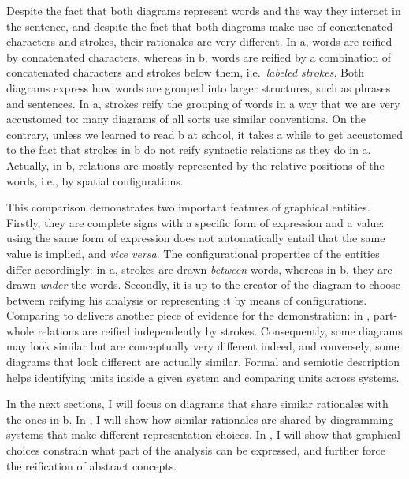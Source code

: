 \documentclass[output=paper]{langsci/langscibook}
\begin{document}
Despite the fact that both diagrams represent words and the way they interact in the sentence, and despite the fact that both diagrams make use of concatenated characters and strokes, their rationales are very different. In a, words are reified by concatenated characters, whereas in b, words are reified by a combination of concatenated characters and strokes below them, i.e.~\textit{labeled strokes}. Both diagrams express how words are grouped into larger structures, such as phrases and sentences. In a, strokes reify the grouping of words in a way that we are very accustomed to: many diagrams of all sorts use similar conventions. On the contrary, unless we learned to read b at school, it takes a while to get accustomed to the fact that strokes in b do not reify syntactic relations as they do in a. Actually, in b, relations are mostly represented by the relative positions of the words, i.e., by spatial configurations.

This comparison demonstrates two important features of graphical entities. Firstly, they are complete signs with a specific form of expression and a value: using the same form of expression does not automatically entail that the same value is implied, and \textit{vice versa}. The configurational properties of the entities differ accordingly: in a, strokes are drawn \textit{between} words, whereas in b, they are drawn \textit{under} the words. Secondly, it is up to the creator of the diagram to choose between reifying his analysis or representing it by means of configurations. Comparing  to  delivers another piece of evidence for the demonstration: in , part-whole relations are reified independently by strokes. Consequently, some diagrams may look similar but are conceptually very different indeed, and conversely, some diagrams that look different are actually similar. Formal and semiotic description helps identifying units inside a given system and comparing units across systems. 

In the next sections, I will focus on diagrams that share similar rationales with the ones in b. In , I will show how similar rationales are shared by diagramming systems that make different representation choices. In , I will show that graphical choices constrain what part of the analysis can be expressed, and further force the reification of abstract concepts.
\end{document}
